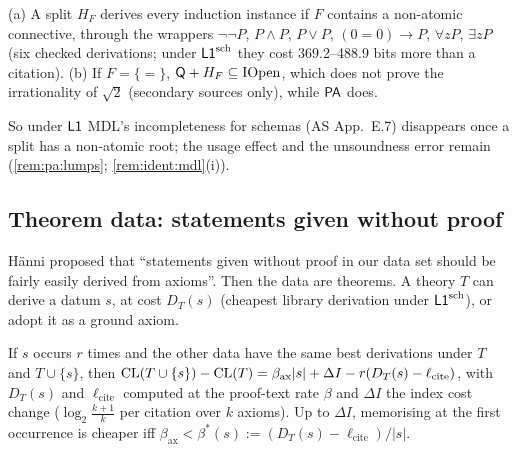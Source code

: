 \begin{proposition}[Detours]\pabrk{}\label{prop:pa:detour}
(a) A split $H_F$ derives every induction instance if $F$ contains a non-atomic connective, through the wrappers $\neg\neg P$, $P\wedge P$, $P\vee P$, $(0=0)\to P$, $\forall zP$, $\exists zP$ (six checked derivations; under $\mathord{\mathsf{L1}}^{\mathrm{sch}}$ they cost 369.2--488.9 bits more than a citation). (b) If $F=\{=\}$, $\mathsf{Q}+H_F\subseteq\mathrm{IOpen}$, which does not prove the irrationality of $\sqrt2$ \citep{shepherdson1964nonstandard} (secondary sources only), while $\mathsf{PA}$ does.
\end{proposition}

\noindent So under $\mathord{\mathsf{L1}}$ MDL's incompleteness for schemas (AS App.~E.7) disappears once a split has a non-atomic root; the usage effect and the unsoundness error remain (\cref{rem:pa:lumps}; \cref{rem:ident:mdl}(i)).

\subsection{Theorem data: statements given without proof}\label{sec:pa:theorems}

H\"anni proposed that ``statements given without proof in our data set should be fairly easily derived from axioms''. Then the data are theorems. A theory $T$ can derive a datum $s$, at cost $D_T(s)$ (cheapest library derivation under $\mathord{\mathsf{L1}}^{\mathrm{sch}}$), or adopt it as a ground axiom.

\begin{proposition}\pabrk{}\label{prop:pa:memo}
If $s$ occurs $r$ times and the other data have the same best derivations under $T$ and $T\cup\{s\}$, then $\mathrm{CL}(T\cup\{s\})-\mathrm{CL}(T)=\beta_{\mathrm{ax}}|s|+\Delta I-r(D_T(s)-\ell_{\mathrm{cite}})$, with $D_T(s)$ and $\ell_{\mathrm{cite}}$ computed at the proof-text rate $\beta$ and $\Delta I$ the index cost change ($\log_2\frac{k+1}k$ per citation over $k$ axioms). Up to $\Delta I$, memorising at the first occurrence is cheaper iff $\beta_{\mathrm{ax}}<\beta^*(s):=(D_T(s)-\ell_{\mathrm{cite}})/|s|$.
\end{proposition}

